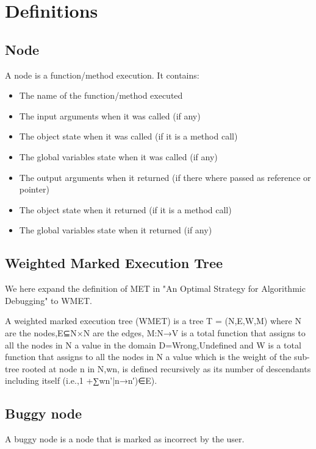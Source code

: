 \chapter{Definitions}
\label{cap:definiciones}


\section{Node}
A node is a function/method execution.
It contains:
\begin{itemize}
\item The name of the function/method executed
\item The input arguments when it was called (if any)
\item The object state when it was called (if it is a method call)
\item The global variables state when it was called (if any)
\item The output arguments when it returned (if there where passed as reference or pointer)
\item The object state when it returned (if it is a method call)
\item The global variables state when it returned (if any)
\end{itemize}
\section{Weighted Marked Execution Tree}
We here expand the definition of MET in "An Optimal Strategy for Algorithmic Debugging" to WMET.

A weighted marked execution tree (WMET) is a tree T = (N,E,W,M) where N are the nodes,E⊆N×N are  the edges, M:N→V is a total function that assigns to all the nodes in N a value in the domain D={Wrong,Undefined} and W is a total function that assigns to all the nodes in N a value which is the weight  of  the  sub-tree  rooted  at  node n in N,wn,  is  defined recursively as its number of descendants including itself (i.e.,1 +∑{wn'|n→n′)∈E}).
\section{Buggy node}
A buggy node is a node that is marked as incorrect by the user.


